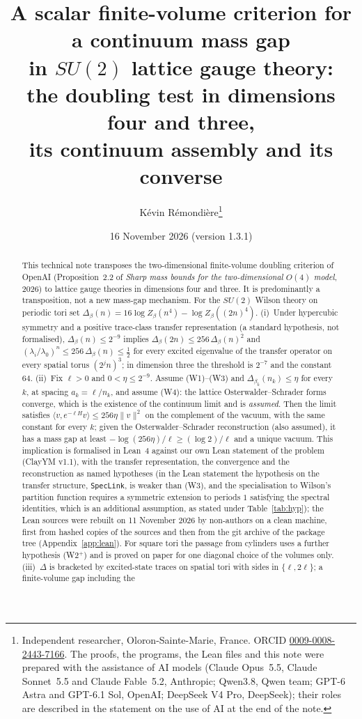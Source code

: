 \documentclass[11pt,a4paper]{article}
\title{A scalar finite-volume criterion for a continuum mass gap\\ in $SU(2)$ lattice gauge theory:\\ the doubling test in dimensions four and three,\\ its continuum assembly and its converse}
\author{K\'evin R\'emondi\`ere\thanks{Independent researcher, Oloron-Sainte-Marie, France. ORCID
\href{https://orcid.org/0009-0008-2443-7166}{0009-0008-2443-7166}. The proofs, the programs, the Lean files and this note were
prepared with the assistance of AI models (Claude Opus~5.5, Claude Sonnet~5.5 and Claude Fable~5.2, Anthropic; Qwen3.8, Qwen team; GPT-6 Astra and GPT-6.1 Sol, OpenAI; DeepSeek V4 Pro, DeepSeek); their roles are described in the
statement on the use of AI at the end of the note.}}
\date{16 November 2026 (version 1.3.1)}
\theoremstyle{plain}
\theoremstyle{definition}
\theoremstyle{remark}
\numberwithin{equation}{section}
\begin{document}
\maketitle

\begin{abstract}
This technical note transposes the two-dimensional finite-volume doubling criterion of OpenAI (Proposition~2.2 of \emph{Sharp mass bounds
for the two-dimensional $O(4)$ model}, 2026) to lattice gauge theories in dimensions four and three. It is predominantly a transposition,
not a new mass-gap mechanism. For the $SU(2)$ Wilson theory on periodic tori set
$\Delta_\beta(n)=16\log Z_\beta(n^4)-\log Z_\beta((2n)^4)$.
(i)~Under hypercubic symmetry and a positive trace-class transfer representation (a standard hypothesis, not formalised),
$\Delta_\beta(n)\le2^{-9}$ implies $\Delta_\beta(2n)\le256\,\Delta_\beta(n)^2$ and
$(\lambda_i/\lambda_0)^n\le256\,\Delta_\beta(n)\le\frac12$ for every excited eigenvalue of the transfer operator on every spatial torus
$(2^jn)^3$; in dimension three the threshold is $2^{-7}$ and the constant $64$.
(ii)~Fix $\ell>0$ and $0<\eta\le2^{-9}$. Assume (W1)--(W3) and $\Delta_{\beta_k}(n_k)\le\eta$ for every $k$, at spacing $a_k=\ell/n_k$, and assume (W4): the lattice
Osterwalder--Schrader forms converge, which is the existence of the continuum limit and is \emph{assumed}. Then the limit satisfies
$\langle v,e^{-\ell H}v\rangle\le256\eta\|v\|^2$ on the complement of the vacuum, with the same constant for every $k$; given the
Osterwalder--Schrader reconstruction (also assumed), it has a mass gap at least $-\log(256\eta)/\ell\ge(\log2)/\ell$ and a unique vacuum.
This implication is formalised in Lean~4 against our own Lean statement of the problem (ClayYM v1.1), with the transfer representation, the
convergence and the reconstruction as named hypotheses (in the Lean statement the hypothesis on the transfer structure, \texttt{SpecLink}, is weaker than (W3), and the specialisation to Wilson's partition function requires a symmetric extension to periods $1$ satisfying the spectral identities, which is an additional assumption, as stated under Table~\ref{tab:hyp}); the Lean sources were rebuilt on 11 November 2026 by non-authors on a clean
machine, first from hashed copies of the sources and then from the git archive of the package tree (Appendix~\ref{app:lean}). For square tori the passage from cylinders uses a further hypothesis (W2$^+$) and is proved on paper for one
diagonal choice of the volumes only.
(iii)~$\Delta$ is bracketed by excited-state traces on spatial tori with sides in $\{\ell,2\ell\}$; a finite-volume gap including the

\end{abstract}
\end{document}
